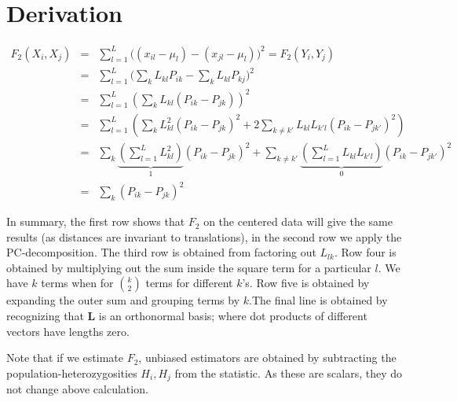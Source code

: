 \documentclass[10pt,a4paper]{article}
\newcommand{\ML}{\mathbf{L}} %
\begin{document}
\section{Derivation}\label{appendix:fonpc}
\begin{eqnarray}
F_2(X_i, X_j) &=& \sum_{l=1}^L \big( (x_{il} - \mu_l) -(x_{jl} -\mu_l)\big)^2 = F_2(Y_i, Y_j)\nonumber\\
&=& \sum_{l=1}^L \big( \sum_k L_{kl}P_{ik} - \sum_kL_{kl}P_{kj}\big)^2\nonumber\\
&=& \sum_{l=1}^L \left( \sum_k L_{kl} (P_{ik} -P_{jk}) \right)^2\nonumber\\
&=& \sum_{l=1}^L \left( \sum_k L_{kl}^2 (P_{ik} -P_{jk})^2 + 2\sum_{k\neq k'} L_{kl}L_{k'l}(P_{ik} - P_{jk'})^2 \right)\nonumber\\
&=& \sum_k \underbrace{\left(\sum_{l=1}^L L_{kl}^2\right)}_1 (P_{ik} -P_{jk})^2 + \sum_{k\neq k'}\underbrace{\left(\sum_{l=1}^L L_{kl}L_{k'l}\right)}_{0} (P_{ik} - P_{jk'})^2\nonumber\\
&=& \sum_k (P_{ik} - P_{jk})^2
\end{eqnarray}

In summary, the first row shows that $F_2$ on the centered data will give the same results (as distances are invariant to translations), in the second row we apply the PC-decomposition. The third row is obtained from factoring out $L_{lk}$. Row four is obtained by multiplying out the sum inside the square term for a particular $l$. We have $k$ terms when for $\binom{k}{2}$ terms for different $k$'s.  Row five is obtained by expanding the outer sum and grouping terms by $k$.The final line is obtained by recognizing that $\ML$ is an orthonormal basis; where dot products of different vectors have lengths zero.

Note that if we estimate $F_2$, unbiased estimators are obtained by subtracting the population-heterozygosities $H_i, H_j$ from the statistic. As these are scalars, they do not change above calculation.

\end{document}
